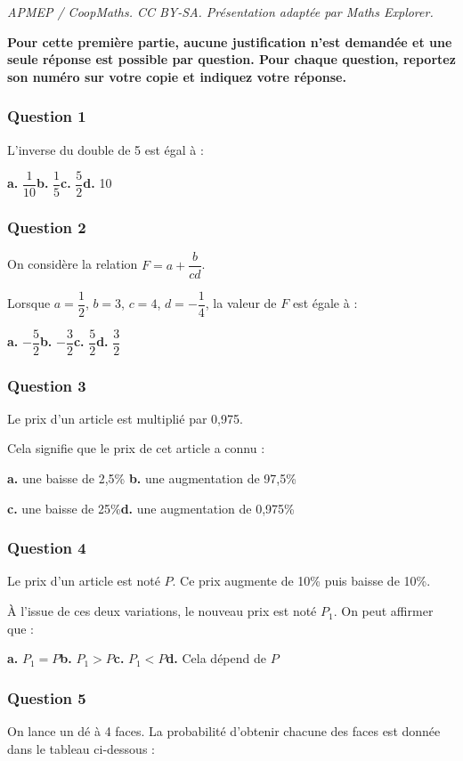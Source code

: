 \documentclass[10pt]{article}
\begin{document}
\noindent\textit{APMEP / CoopMaths. CC BY-SA. Présentation adaptée par Maths Explorer.}\par\medskip
\textbf{Pour cette première partie, aucune justification n'est demandée et une seule réponse est possible par question. Pour chaque question, reportez son numéro sur votre copie et indiquez votre réponse.}

\subsubsection*{Question 1}
L'inverse du double de 5 est égal à :

\textbf{a.} $\dfrac{1}{10}$\hfill \textbf{b.} $\dfrac{1}{5}$\hfill \textbf{c.} $\dfrac{5}{2}$\hfill \textbf{d.} 10

\subsubsection*{Question 2}
On considère la relation $F = a + \dfrac{b}{cd}$.

Lorsque $a = \dfrac{1}{2}$, $b = 3$, $c = 4$, $d = -\dfrac{1}{4}$, la valeur de $F$ est égale à :

\textbf{a.} $-\dfrac{5}{2}$\hfill \textbf{b.} $-\dfrac{3}{2}$\hfill \textbf{c.} $\dfrac{5}{2}$\hfill \textbf{d.} $\dfrac{3}{2}$

\subsubsection*{Question 3}
Le prix d'un article est multiplié par 0,975.

Cela signifie que le prix de cet article a connu :

\textbf{a.}  une baisse de 2,5\% \hfill \textbf{b.} une augmentation de 97,5\%

\textbf{c.} une baisse de 25\%\hfill \textbf{d.} une augmentation de 0,975\%

\subsubsection*{Question 4}
Le prix d'un article est noté $P$. Ce prix augmente de 10\% puis baisse de 10\%.

À l'issue de ces deux variations, le nouveau prix est noté $P_1$. On peut affirmer que :

\textbf{a.} $P_1 = P$\hfill \textbf{b.} $P_1 > P$\hfill \textbf{c.} $P_1 < P$\hfill \textbf{d.} Cela dépend de $P$

\subsubsection*{Question 5}
On lance un dé à 4 faces. La probabilité d'obtenir chacune des faces est donnée dans le tableau ci-dessous :
\end{document}

